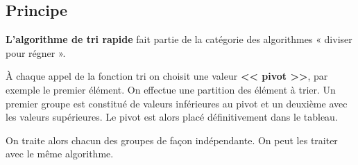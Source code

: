 \subsection{Principe}

\begin{definition2}
\textbf{L'algorithme de tri rapide} fait partie de la catégorie des algorithmes « diviser pour régner ».

À chaque appel de la fonction tri on choisit une valeur \textbf{<< pivot >>}, par exemple le premier élément. On effectue une partition des élément à trier. Un premier groupe est constitué de valeurs inférieures au pivot  et un deuxième avec les valeurs supérieures.
Le pivot est alors placé définitivement dans le tableau.

On traite alors chacun des groupes de façon indépendante. On peut les traiter avec le même algorithme.
\end{definition2}







